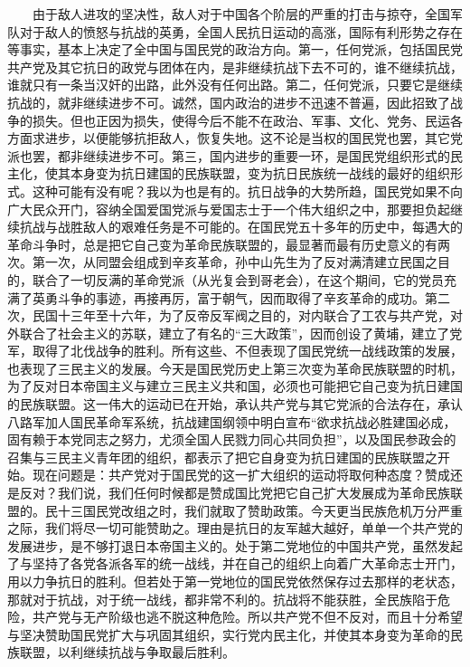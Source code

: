 \documentclass[cn,11pt,chinese]{elegantbook}
\begin{document}
　　由于敌人进攻的坚决性，敌人对于中国各个阶层的严重的打击与掠夺，全国军队对于敌人的愤怒与抗战的英勇，全国人民抗日运动的高涨，国际有利形势之存在等事实，基本上决定了全中国与国民党的政治方向。第一，任何党派，包括国民党共产党及其它抗日的政党与团体在内，是非继续抗战下去不可的，谁不继续抗战，谁就只有一条当汉奸的出路，此外没有任何出路。第二，任何党派，只要它是继续抗战的，就非继续进步不可。诚然，国内政治的进步不迅速不普遍，因此招致了战争的损失。但也正因为损失，使得今后不能不在政治、军事、文化、党务、民运各方面求进步，以便能够抗拒敌人，恢复失地。这不论是当权的国民党也罢，其它党派也罢，都非继续进步不可。第三，国内进步的重要一环，是国民党组织形式的民主化，使其本身变为抗日建国的民族联盟，变为抗日民族统一战线的最好的组织形式。这种可能有没有呢？我以为也是有的。抗日战争的大势所趋，国民党如果不向广大民众开门，容纳全国爱国党派与爱国志士于一个伟大组织之中，那要担负起继续抗战与战胜敌人的艰难任务是不可能的。在国民党五十多年的历史中，每遇大的革命斗争时，总是把它自己变为革命民族联盟的，最显著而最有历史意义的有两次。第一次，从同盟会组成到辛亥革命，孙中山先生为了反对满清建立民国之目的，联合了一切反满的革命党派（从光复会到哥老会），在这个期间，它的党员充满了英勇斗争的事迹，再接再厉，富于朝气，因而取得了辛亥革命的成功。第二次，民国十三年至十六年，为了反帝反军阀之目的，对内联合了工农与共产党，对外联合了社会主义的苏联，建立了有名的“三大政策”，因而创设了黄埔，建立了党军，取得了北伐战争的胜利。所有这些、不但表现了国民党统一战线政策的发展，也表现了三民主义的发展。今天是国民党历史上第三次变为革命民族联盟的时机，为了反对日本帝国主义与建立三民主义共和国，必须也可能把它自己变为抗日建国的民族联盟。这一伟大的运动已在开始，承认共产党与其它党派的合法存在，承认八路军加人国民革命军系统，抗战建国纲领中明白宣布“欲求抗战必胜建国必成，固有赖于本党同志之努力，尤须全国人民戮力同心共同负担”，以及国民参政会的召集与三民主义青年团的组织，都表示了把它自身变为抗日建国的民族联盟之开始。现在问题是：共产党对于国民党的这一扩大组织的运动将取何种态度？赞成还是反对？我们说，我们任何时候都是赞成国比党把它自己扩大发展成为革命民族联盟的。民十三国民党改组之时，我们就取了赞助政策。今天更当民族危机万分严重之际，我们将尽一切可能赞助之。理由是抗日的友军越大越好，单单一个共产党的发展进步，是不够打退日本帝国主义的。处于第二党地位的中国共产党，虽然发起了与坚持了各党各派各军的统一战线，并在自己的组织上向着广大革命志士开门，用以力争抗日的胜利。但若处于第一党地位的国民党依然保存过去那样的老状态，那就对于抗战，对于统一战线，都非常不利的。抗战将不能获胜，全民族陷于危险，共产党与无产阶级也逃不脱这种危险。所以共产党不但不反对，而且十分希望与坚决赞助国民党扩大与巩固其组织，实行党内民主化，并使其本身变为革命的民族联盟，以利继续抗战与争取最后胜利。\\
\end{document}
